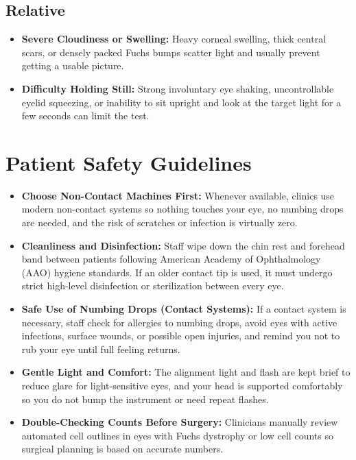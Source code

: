 \subsection{Relative}

\begin{itemize}
    \item \textbf{Severe Cloudiness or Swelling:} Heavy corneal swelling, thick central scars, or densely packed Fuchs bumps scatter light and usually prevent getting a usable picture.
    \item \textbf{Difficulty Holding Still:} Strong involuntary eye shaking, uncontrollable eyelid squeezing, or inability to sit upright and look at the target light for a few seconds can limit the test.
\end{itemize}

\section{Patient Safety Guidelines}

\begin{itemize}
    \item \textbf{Choose Non-Contact Machines First:} Whenever available, clinics use modern non-contact systems so nothing touches your eye, no numbing drops are needed, and the risk of scratches or infection is virtually zero.
    \item \textbf{Cleanliness and Disinfection:} Staff wipe down the chin rest and forehead band between patients following American Academy of Ophthalmology (AAO) hygiene standards. If an older contact tip is used, it must undergo strict high-level disinfection or sterilization between every eye.
    \item \textbf{Safe Use of Numbing Drops (Contact Systems):} If a contact system is necessary, staff check for allergies to numbing drops, avoid eyes with active infections, surface wounds, or possible open injuries, and remind you not to rub your eye until full feeling returns.
    \item \textbf{Gentle Light and Comfort:} The alignment light and flash are kept brief to reduce glare for light-sensitive eyes, and your head is supported comfortably so you do not bump the instrument or need repeat flashes.
    \item \textbf{Double-Checking Counts Before Surgery:} Clinicians manually review automated cell outlines in eyes with Fuchs dystrophy or low cell counts so surgical planning is based on accurate numbers.
\end{itemize}


